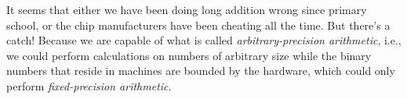 \documentclass[../thesis.tex]{subfiles}
\begin{document}
It seems that either we have been doing long addition wrong since primary school,
or the chip manufacturers have been cheating all the time. But there's a catch!
Because we are capable of what is called \textit{arbitrary-precision arithmetic},
i.e., we could perform calculations on numbers of arbitrary size
while the binary numbers that reside in machines are bounded by the hardware,
which could only perform \textit{fixed-precision arithmetic}.



%
%
%
%
%
%
%
%
%
%
\end{document}
